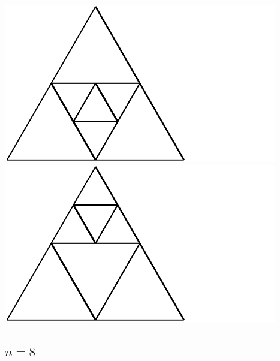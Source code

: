 \documentclass[12pt,amstags,fleqn]{article}
\theoremstyle{plain}
\theoremstyle{definition}
\begin{document}
\includegraphics{output-dissections-dissection7_i27_r3_c2.pdf}
\includegraphics{output-dissections-dissection7_i29_r1_c2.pdf}

\subsection*{$n = 8$}
\end{document}
